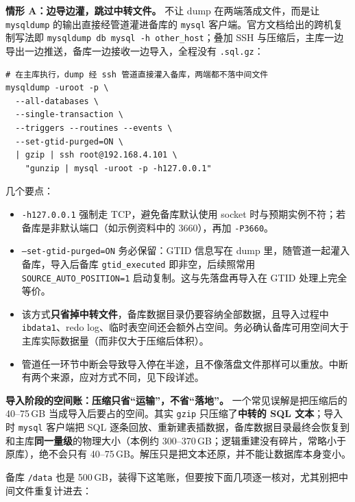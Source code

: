 \documentclass[12pt,UTF8]{ctexbook}
\begin{document}
\textbf{情形 A：边导边灌，跳过中转文件。} 不让 dump 在两端落成文件，而是让 \texttt{mysqldump} 的输出直接经管道灌进备库的 \texttt{mysql} 客户端。官方文档给出的跨机复制写法即 \texttt{mysqldump db \textbar{} mysql -h other\_host}；叠加 SSH 与压缩后，主库一边导出一边推送，备库一边接收一边导入，全程没有 \texttt{.sql.gz}：

\begin{lstlisting}
# 在主库执行，dump 经 ssh 管道直接灌入备库，两端都不落中间文件
mysqldump -uroot -p \
  --all-databases \
  --single-transaction \
  --triggers --routines --events \
  --set-gtid-purged=ON \
  | gzip | ssh root@192.168.4.101 \
    "gunzip | mysql -uroot -p -h127.0.0.1"
\end{lstlisting}

几个要点：

\begin{itemize}[leftmargin=2cm]
  \item \texttt{-h127.0.0.1} 强制走 TCP，避免备库默认使用 socket 时与预期实例不符；若备库是非默认端口（如示例资料中的 3660），再加 \texttt{-P3660}。
  \item \texttt{--set-gtid-purged=ON} 务必保留：GTID 信息写在 dump 里，随管道一起灌入备库，导入后备库 \texttt{gtid\_executed} 即非空，后续照常用 \texttt{SOURCE\_AUTO\_POSITION=1} 启动复制。这与先落盘再导入在 GTID 处理上完全等价。
  \item 该方式\textbf{只省掉中转文件}，备库数据目录仍要容纳全部数据，且导入过程中 \texttt{ibdata1}、redo log、临时表空间还会额外占空间。务必确认备库可用空间大于主库实际数据量（而非仅大于压缩后体积）。
  \item 管道任一环节中断会导致导入停在半途，且不像落盘文件那样可以重放。中断有两个来源，应对方式不同，见下段详述。
\end{itemize}

\textbf{导入阶段的空间账：压缩只省“运输”，不省“落地”。} 一个常见误解是把压缩后的 40--75\,GB 当成导入后要占的空间。其实 \texttt{gzip} 只压缩了\textbf{中转的 SQL 文本}；导入时 \texttt{mysql} 客户端把 SQL 逐条回放、重新建表插数据，备库数据目录最终会恢复到和主库\textbf{同一量级}的物理大小（本例约 300--370\,GB；逻辑重建没有碎片，常略小于原库），绝不会只有 40--75\,GB。解压只是把文本还原，并不能让数据库本身变小。

备库 \texttt{/data} 也是 500\,GB，装得下这笔账，但要按下面几项逐一核对，尤其别把中间文件重复计进去：
\end{document}

